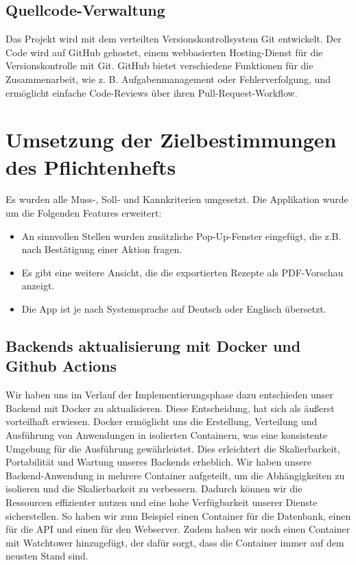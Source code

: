 \documentclass{implementierungsheft}
\begin{document}
\subsection{Quellcode-Verwaltung}
Das Projekt wird mit dem verteilten Versionskontrollsystem Git entwickelt. Der Code wird
auf GitHub gehostet, einem webbasierten Hosting-Dienst für die Versionskontrolle mit Git. GitHub bietet
verschiedene Funktionen für die Zusammenarbeit, wie z. B. Aufgabenmanagement oder Fehlerverfolgung, und ermöglicht einfache
Code-Reviews über ihren Pull-Request-Workflow.
\newpage

\section{Umsetzung der Zielbestimmungen des Pflichtenhefts}
Es wurden alle Muss-, Soll- und Kannkriterien umgesetzt. Die Applikation wurde um die Folgenden Features erweitert:
\begin{itemize}
    \item An sinnvollen Stellen wurden zusätzliche Pop-Up-Fenster eingefügt, die z.B. nach Bestätigung einer Aktion fragen.
    \item Es gibt eine weitere Ansicht, die die exportierten Rezepte als PDF-Vorschau anzeigt.
    \item Die App ist je nach Systemsprache auf Deutsch oder Englisch übersetzt.
\end{itemize}

\subsection{Backends aktualisierung mit Docker und Github Actions}
Wir haben uns im Verlauf der Implementierungsphase dazu entschieden unser Backend mit Docker zu aktualisieren.
Diese Entscheidung, hat sich als äußerst vorteilhaft erwiesen. Docker ermöglicht uns die Erstellung, Verteilung und Ausführung von Anwendungen in isolierten Containern, was eine konsistente Umgebung für die Ausführung gewährleistet. Dies erleichtert die Skalierbarkeit, Portabilität und Wartung unseres Backends erheblich.
Wir haben unsere Backend-Anwendung in mehrere Container aufgeteilt, um die Abhängigkeiten zu isolieren und die Skalierbarkeit zu verbessern. Dadurch können wir die Ressourcen effizienter nutzen und eine hohe Verfügbarkeit unserer Dienste sicherstellen.
So haben wir zum Beispiel einen Container für die Datenbank, einen für die API und einen für den Webserver.
Zudem haben wir noch einen Container mit Watchtower hinzugefügt, der dafür sorgt, dass die Container immer auf dem neusten Stand sind.
\end{document}
